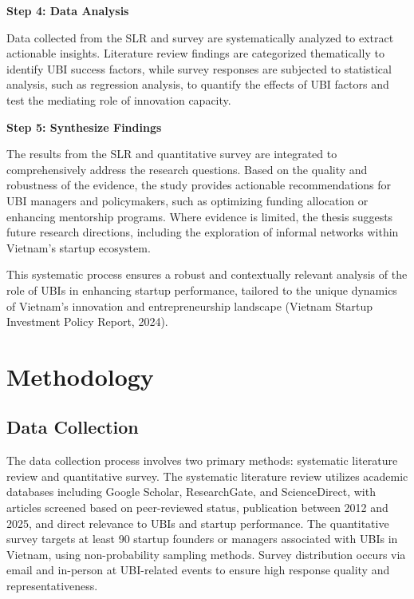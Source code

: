 \documentclass[../Main.tex]{subfiles}
\begin{document}
	\begin{center}
		\begin{minipage}[c]{\textwidth}
		\vspace*{\fill}

	\textbf{Step 4: Data Analysis}

	Data collected from the SLR and survey are systematically analyzed to extract actionable insights. Literature review findings are categorized thematically to identify UBI success factors, while survey responses are subjected to statistical analysis, such as regression analysis, to quantify the effects of UBI factors and test the mediating role of innovation capacity.

	\textbf{Step 5: Synthesize Findings}

	The results from the SLR and quantitative survey are integrated to comprehensively address the research questions. Based on the quality and robustness of the evidence, the study provides actionable recommendations for UBI managers and policymakers, such as optimizing funding allocation or enhancing mentorship programs. Where evidence is limited, the thesis suggests future research directions, including the exploration of informal networks within Vietnam's startup ecosystem.

	This systematic process ensures a robust and contextually relevant analysis of the role of UBIs in enhancing startup performance, tailored to the unique dynamics of Vietnam's innovation and entrepreneurship landscape (Vietnam Startup Investment Policy Report, 2024).

		\end{minipage}
	\end{center}

	\section{Methodology}
	\label{section:1.5_Methodology}

	\subsection{Data Collection}
	\label{subsection:1.5.1_Data_collection}
	The data collection process involves two primary methods: systematic literature review and quantitative survey. The systematic literature review utilizes academic databases including Google Scholar, ResearchGate, and ScienceDirect, with articles screened based on peer-reviewed status, publication between 2012 and 2025, and direct relevance to UBIs and startup performance. The quantitative survey targets at least 90 startup founders or managers associated with UBIs in Vietnam, using non-probability sampling methods. Survey distribution occurs via email and in-person at UBI-related events to ensure high response quality and representativeness.
\end{document}
